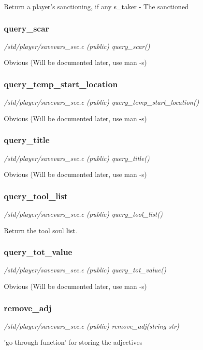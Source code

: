 Return a player's sanctioning, if any
s\_taker - The sanctioned


\subsubsection{query\_scar}

{\em /std/player/savevars\_sec.c (public) query\_scar()}

Obvious (Will be documented later, use man -s)


\subsubsection{query\_temp\_start\_location}

{\em /std/player/savevars\_sec.c (public) query\_temp\_start\_location()}

Obvious (Will be documented later, use man -s)


\subsubsection{query\_title}

{\em /std/player/savevars\_sec.c (public) query\_title()}

Obvious (Will be documented later, use man -s)


\subsubsection{query\_tool\_list}

{\em /std/player/savevars\_sec.c (public) query\_tool\_list()}

Return the tool soul list.


\subsubsection{query\_tot\_value}

{\em /std/player/savevars\_sec.c (public) query\_tot\_value()}

Obvious (Will be documented later, use man -s)


\subsubsection{remove\_adj}

{\em /std/player/savevars\_sec.c (public) remove\_adj(string str)}

'go through function' for storing the adjectives


